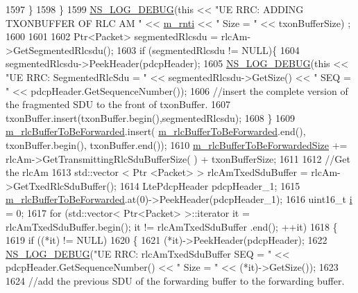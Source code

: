 \begin{DoxyCode}
1597           \}
1598         \} 
1599         \hyperlink{group__logging_ga413f1886406d49f59a6a0a89b77b4d0a}{NS\_LOG\_DEBUG}(\textcolor{keyword}{this} << \textcolor{stringliteral}{"UE RRC:  ADDING TXONBUFFER OF RLC AM "} << 
      \hyperlink{classns3_1_1LteUeRrc_a8e078d8ef0ad23e670fe2ef08caab84f}{m\_rnti} << \textcolor{stringliteral}{" Size = "} << txonBufferSize) ;
1600 
1601       
1602         Ptr<Packet> segmentedRlcsdu = rlcAm->GetSegmentedRlcsdu();
1603         \textcolor{keywordflow}{if} (segmentedRlcsdu != NULL)\{
1604           segmentedRlcsdu->PeekHeader(pdcpHeader);
1605           \hyperlink{group__logging_ga413f1886406d49f59a6a0a89b77b4d0a}{NS\_LOG\_DEBUG}(\textcolor{keyword}{this} << \textcolor{stringliteral}{"UE RRC: SegmentedRlcSdu = "} << segmentedRlcsdu->GetSize() << \textcolor{stringliteral}{"
       SEQ = "} << pdcpHeader.GetSequenceNumber());
1606           \textcolor{comment}{//insert the complete version of the fragmented SDU to the front of txonBuffer.}
1607           txonBuffer.insert(txonBuffer.begin(),segmentedRlcsdu);
1608         \}
1609         \hyperlink{classns3_1_1LteUeRrc_acf565bc650023495082a94923956fb1a}{m\_rlcBufferToBeForwarded}.insert(
      \hyperlink{classns3_1_1LteUeRrc_acf565bc650023495082a94923956fb1a}{m\_rlcBufferToBeForwarded}.end(), txonBuffer.begin(), txonBuffer.end());
1610         \hyperlink{classns3_1_1LteUeRrc_afb37a53dac05a0ae624acab488e33d6f}{m\_rlcBufferToBeForwardedSize} += rlcAm->GetTransmittingRlcSduBufferSize(
      ) + txonBufferSize;
1611 
1612         \textcolor{comment}{//Get the rlcAm}
1613         std::vector < Ptr <Packet> > rlcAmTxedSduBuffer = rlcAm->GetTxedRlcSduBuffer();
1614         LtePdcpHeader pdcpHeader\_1;
1615         \hyperlink{classns3_1_1LteUeRrc_acf565bc650023495082a94923956fb1a}{m\_rlcBufferToBeForwarded}.at(0)->PeekHeader(pdcpHeader\_1);
1616         uint16\_t \hyperlink{bernuolliDistribution_8m_a6f6ccfcf58b31cb6412107d9d5281426}{i} = 0;
1617         \textcolor{keywordflow}{for} (std::vector< Ptr<Packet> >::iterator it = rlcAmTxedSduBuffer.begin(); it != rlcAmTxedSduBuffer
      .end(); ++it)
1618         \{
1619           \textcolor{keywordflow}{if} ((*it) != NULL)
1620           \{
1621             (*it)->PeekHeader(pdcpHeader);
1622             \hyperlink{group__logging_ga413f1886406d49f59a6a0a89b77b4d0a}{NS\_LOG\_DEBUG}(\textcolor{stringliteral}{"UE RRC: rlcAmTxedSduBuffer SEQ = "} << pdcpHeader.GetSequenceNumber() 
      << \textcolor{stringliteral}{" Size = "} << (*it)->GetSize());
1623           
1624             \textcolor{comment}{//add the previous SDU of the forwarding buffer to the forwarding buffer.}

\end{DoxyCode}
